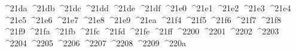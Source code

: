 {  ^^^^21da%
  ^^^^21db%
  ^^^^21dc%
  ^^^^21dd%
  ^^^^21de%
  ^^^^21df%
  ^^^^21e0%
  ^^^^21e1%
  ^^^^21e2%
  ^^^^21e3%
  ^^^^21e4%
  ^^^^21e5%
  ^^^^21e6%
  ^^^^21e7%
  ^^^^21e8%
  ^^^^21e9%
  ^^^^21ea%
  ^^^^21f4%
  ^^^^21f5%
  ^^^^21f6%
  ^^^^21f7%
  ^^^^21f8%
  ^^^^21f9%
  ^^^^21fa%
  ^^^^21fb%
  ^^^^21fc%
  ^^^^21fd%
  ^^^^21fe%
  ^^^^21ff%
  ^^^^2200%
  ^^^^2201%
  ^^^^2202%
  ^^^^2203%
  ^^^^2204%
  ^^^^2205%
  ^^^^2206%
  ^^^^2207%
  ^^^^2208%
  ^^^^2209%
  ^^^^220a%
}
